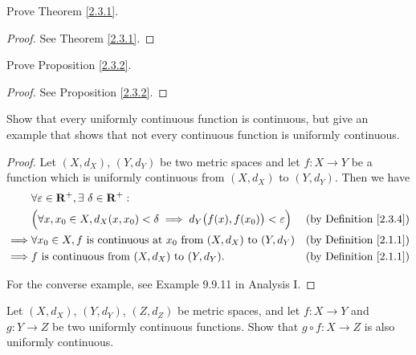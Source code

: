 \exercisesection

\begin{exercise}\label{ex 2.3.1}
    Prove Theorem \ref{2.3.1}.
\end{exercise}

\begin{proof}
    See Theorem \ref{2.3.1}.
\end{proof}

\begin{exercise}\label{ex 2.3.2}
    Prove Proposition \ref{2.3.2}.
\end{exercise}

\begin{proof}
    See Proposition \ref{2.3.2}.
\end{proof}

\begin{exercise}\label{ex 2.3.3}
    Show that every uniformly continuous function is continuous, but give an example that shows that not every continuous function is uniformly continuous.
\end{exercise}

\begin{proof}
    Let \((X, d_X)\), \((Y, d_Y)\) be two metric spaces and let \(f : X \to Y\) be a function which is uniformly continuous from \((X, d_X)\) to \((Y, d_Y)\).
    Then we have
    \begin{align*}
                 & \forall \varepsilon \in \mathbf{R}^+, \exists\ \delta \in \mathbf{R}^+ :                                                                                   \\
                 & \Big(\forall x, x_0 \in X, d_X(x, x_0) < \delta \implies d_Y\big(f(x), f(x_0)\big) < \varepsilon\Big) & \text{(by Definition \ref{2.3.4})} \\
        \implies & \forall x_0 \in X, f \text{ is continuous at } x_0 \text{ from } (X, d_X) \text{ to } (Y, d_Y)        & \text{(by Definition \ref{2.1.1})} \\
        \implies & f \text{ is continuous from } (X, d_X) \text{ to } (Y, d_Y).                                          & \text{(by Definition \ref{2.1.1})}
    \end{align*}

    For the converse example, see Example 9.9.11 in Analysis I.
\end{proof}

\begin{exercise}\label{ex 2.3.4}
    Let \((X, d_X)\), \((Y, d_Y)\), \((Z, d_Z)\) be metric spaces, and let \(f : X \to Y\) and \(g : Y \to Z\) be two uniformly continuous functions.
    Show that \(g \circ f : X \to Z\) is also uniformly continuous.
\end{exercise}

